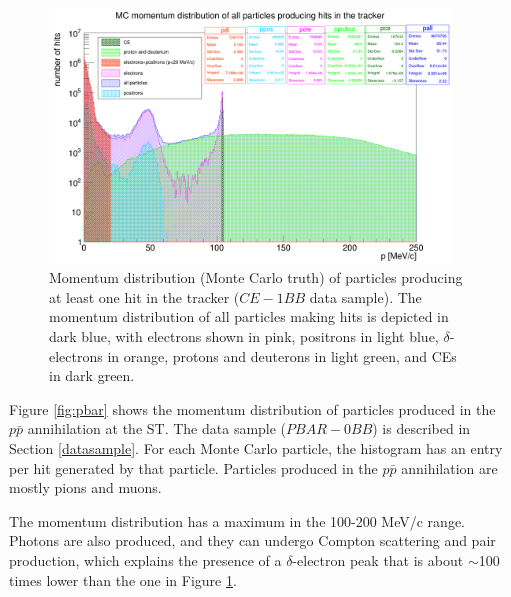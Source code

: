 \begin{figure}[!h]
        \centering
        \includegraphics[width =0.95\textwidth]{figures/png/Screenshot_20240812_152905.png}
    \caption[Monte Carlo momentum distribution 
    of particles producing hits in the Mu2e 
    tracker ($CE-1BB$ data sample).]{
        Momentum distribution (Monte Carlo truth)  
       of particles producing at 
       least one hit in the tracker 
       ($CE-1BB$ data sample).  
       The momentum distribution 
       of all particles making hits is 
       depicted in dark blue, with electrons 
       shown in pink, positrons in light 
       blue, $\delta$-electrons in orange, protons 
       and deuterons in 
       light green, and CEs in dark green. }
       \label{fig:momhits}
\end{figure}


Figure \ref{fig:pbar} shows the momentum distribution of 
particles produced in the $p\bar{p}$ annihilation at the ST. 
The data sample ($PBAR-0BB$) is described in Section \ref{datasample}.
For each Monte Carlo particle, the histogram 
has an entry per hit generated by that particle. 
Particles produced in the $p\bar{p}$ annihilation 
are mostly pions and muons.

The momentum distribution has a 
maximum in the 100-200 MeV/c range. Photons are also 
produced, and they can undergo Compton scattering and 
pair production, which explains the presence of a 
$\delta$-electron peak that is about $\sim$100 
times lower than the one in Figure \ref{fig:momhits}.

